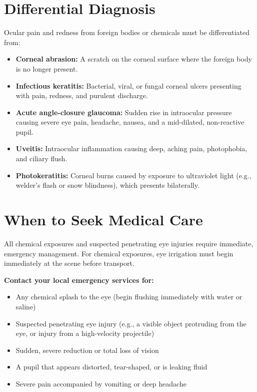 \section*{Differential Diagnosis}
Ocular pain and redness from foreign bodies or chemicals must be differentiated from:
\begin{itemize}
    \item \textbf{Corneal abrasion:} A scratch on the corneal surface where the foreign body is no longer present.
    \item \textbf{Infectious keratitis:} Bacterial, viral, or fungal corneal ulcers presenting with pain, redness, and purulent discharge.
    \item \textbf{Acute angle-closure glaucoma:} Sudden rise in intraocular pressure causing severe eye pain, headache, nausea, and a mid-dilated, non-reactive pupil.
    \item \textbf{Uveitis:} Intraocular inflammation causing deep, aching pain, photophobia, and ciliary flush.
    \item \textbf{Photokeratitis:} Corneal burns caused by exposure to ultraviolet light (e.g., welder's flash or snow blindness), which presents bilaterally.
\end{itemize}

\section*{When to Seek Medical Care}
All chemical exposures and suspected penetrating eye injuries require immediate, emergency management. For chemical exposures, eye irrigation must begin immediately at the scene before transport.

\textbf{Contact your local emergency services for:}
\begin{itemize}
    \item Any chemical splash to the eye (begin flushing immediately with water or saline)
    \item Suspected penetrating eye injury (e.g., a visible object protruding from the eye, or injury from a high-velocity projectile)
    \item Sudden, severe reduction or total loss of vision
    \item A pupil that appears distorted, tear-shaped, or is leaking fluid
    \item Severe pain accompanied by vomiting or deep headache
\end{itemize}

